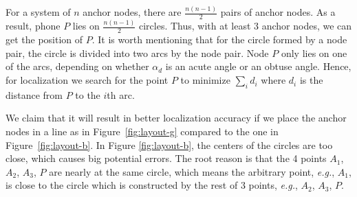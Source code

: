 \documentclass[]{sig-alternate-10pt}
\newcommand{\MYCUT}[1]{{ }}
\def\eg{\textit{e.g.}\xspace}
\begin{document}
For a system of $n$ anchor nodes, there are $\frac {n(n-1)}{2}$  pairs
of anchor nodes.
As a result, phone $P$ lies on $\frac {n(n-1)}{2}$ circles.
Thus, with at least 3 anchor nodes, we can get the position of $P$.
It is worth mentioning that for the circle formed by a node pair, the
circle is divided into two arcs by the node pair.
Node $P$ only lies on one of the arcs,
 depending on whether $\alpha_d$ is an acute angle or an obtuse angle.
Hence, for localization we search for the point $P$
 to minimize  $ \sum_i d_i$ where $d_i$ is the distance
 from $P$ to the $i$th arc.

We claim that it will result in better
localization accuracy if we place the anchor nodes in a line as in
Figure~\ref{fig:layout-g} compared to the one in
Figure~\ref{fig:layout-b}.
In Figure \ref{fig:layout-b}, the centers of the
 circles are too close, which causes big potential errors.
The root reason is that the 4 points $A_1$, $A_2$, $A_3$, $P$ are nearly at the
 same circle, which means the arbitrary point, \eg, $A_1$, is close to
 the circle which is constructed by the rest of 3 points, \eg, $A_2$, $A_3$, $P$.
\MYCUT{\begin{figure}[htb]
\begin{subfigure}[b]{0.22\textwidth}
                \centering
\texttt{[image: goodput-crop]}
                \caption{Good layout}
        \end{subfigure}
\begin{subfigure}[b]{0.2\textwidth}
                \centering
\texttt{[image: badput-crop]}
                \caption{Bad layout}
        \end{subfigure}
\caption{The effect by the layout of the anchor nodes.
    \label{fig:layout}}
\end{figure}
}
\end{document}
